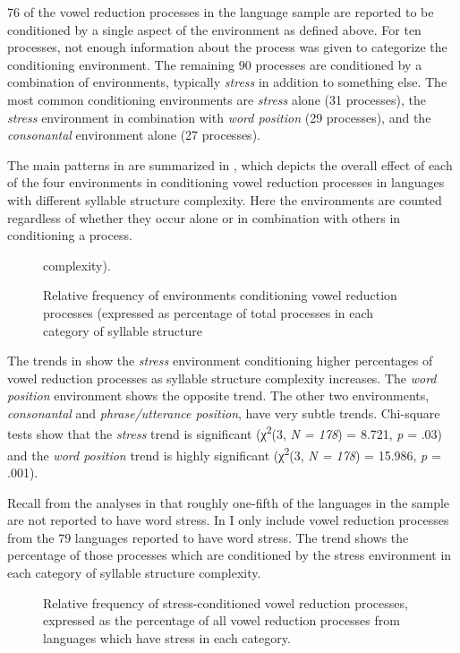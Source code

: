   76 of the vowel reduction processes in the language sample are reported to be conditioned by a single aspect of the environment as defined above. For ten processes, not enough information about the process was given to categorize the conditioning environment. The remaining 90 processes are conditioned by a combination of environments, typically \textit{stress} in addition to something else. The most common conditioning environments are \textit{stress} alone (31 processes), the \textit{stress} environment in combination with \textit{word position} (29 processes), and the \textit{consonantal} environment alone (27 processes).

  The main patterns in  are summarized in , which depicts the overall effect of each of the four environments in conditioning vowel reduction processes in languages with different syllable structure complexity. Here the environments are counted regardless of whether they occur alone or in combination with others in conditioning a process.

  
\begin{figure}
\caption{\label{fig:6.2} Relative frequency of environments conditioning vowel reduction processes (expressed as percentage of total processes in each category of syllable structure} complexity).
\end{figure}

  The trends in  show the \textit{stress} environment conditioning higher percentages of vowel reduction processes as syllable structure complexity increases. The \textit{word position} environment shows the opposite trend. The other two environments, \textit{consonantal} and \textit{phrase/utterance position}, have very subtle trends. Chi-square tests show that the \textit{stress} trend is significant (χ\textsuperscript{2}(3, \textit{N = 178}) = 8.721, \textit{p} = .03) and the \textit{word position} trend is highly significant (χ\textsuperscript{2}(3, \textit{N = 178}) = 15.986, \textit{p} = .001).

  Recall from the analyses in  that roughly one-fifth of the languages in the sample are not reported to have word stress. In  I only include vowel reduction processes from the 79 languages reported to have word stress. The trend shows the percentage of those processes which are conditioned by the stress environment in each category of syllable structure complexity.

  
\begin{figure}
\caption{\label{fig:6.3} Relative frequency of stress-conditioned vowel reduction processes, expressed as the percentage of all vowel reduction processes from languages which have stress in each category.}
\end{figure}


